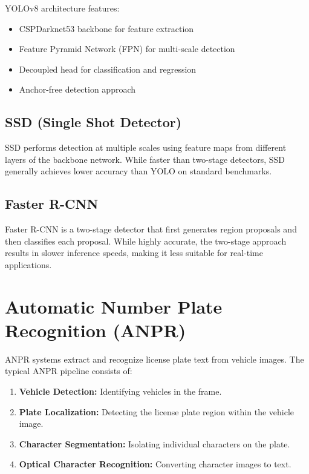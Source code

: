 \documentclass[12pt,a4paper]{report}
\begin{document}
YOLOv8 architecture features:
\begin{itemize}
    \item CSPDarknet53 backbone for feature extraction
    \item Feature Pyramid Network (FPN) for multi-scale detection
    \item Decoupled head for classification and regression
    \item Anchor-free detection approach
\end{itemize}

\subsection{SSD (Single Shot Detector)}

SSD performs detection at multiple scales using feature maps from different layers of the backbone network. While faster than two-stage detectors, SSD generally achieves lower accuracy than YOLO on standard benchmarks.

\subsection{Faster R-CNN}

Faster R-CNN is a two-stage detector that first generates region proposals and then classifies each proposal. While highly accurate, the two-stage approach results in slower inference speeds, making it less suitable for real-time applications.

\section{Automatic Number Plate Recognition (ANPR)}

ANPR systems extract and recognize license plate text from vehicle images. The typical ANPR pipeline consists of:

\begin{enumerate}
    \item \textbf{Vehicle Detection:} Identifying vehicles in the frame.
    \item \textbf{Plate Localization:} Detecting the license plate region within the vehicle image.
    \item \textbf{Character Segmentation:} Isolating individual characters on the plate.
    \item \textbf{Optical Character Recognition:} Converting character images to text.
\end{enumerate}
\end{document}
